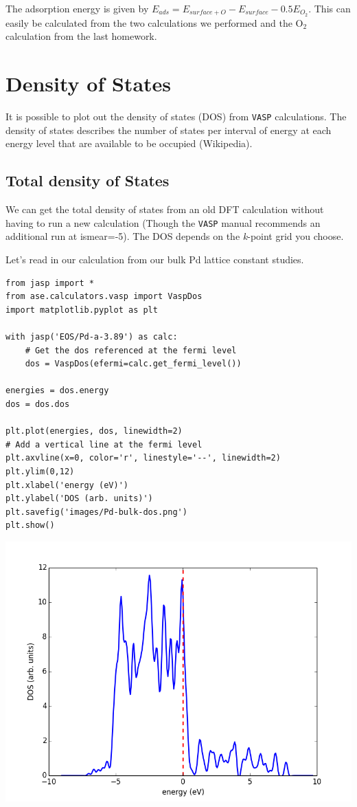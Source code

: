 \documentclass[11pt]{article}
\begin{document}
The adsorption energy is given by $E_{ads} = E_{surface+O} - E_{surface} - 0.5 E_{O_{2}}$. This can easily be calculated from the two calculations we performed and the O$_{\text{2}}$ calculation from the last homework.


\section{Density of States}
\label{sec-4}

It is possible to plot out the density of states (DOS) from \texttt{VASP} calculations. The density of states describes the number of states per interval of energy at each energy level that are available to be occupied (Wikipedia). 

\subsection{Total density of States}
\label{sec-4-1}

We can get the total density of states from an old DFT calculation without having to run a new calculation (Though the \texttt{VASP} manual recommends an additional run at ismear=-5). The DOS depends on the \emph{k}-point grid you choose.


Let's read in our calculation from our bulk Pd lattice constant studies.

\begin{verbatim}
from jasp import *
from ase.calculators.vasp import VaspDos
import matplotlib.pyplot as plt

with jasp('EOS/Pd-a-3.89') as calc:
    # Get the dos referenced at the fermi level
    dos = VaspDos(efermi=calc.get_fermi_level())
  
energies = dos.energy
dos = dos.dos

plt.plot(energies, dos, linewidth=2)
# Add a vertical line at the fermi level
plt.axvline(x=0, color='r', linestyle='--', linewidth=2)
plt.ylim(0,12)
plt.xlabel('energy (eV)')
plt.ylabel('DOS (arb. units)')
plt.savefig('images/Pd-bulk-dos.png')
plt.show()
\end{verbatim}

\includegraphics[width=.9\linewidth]{./images/Pd-bulk-dos.png}
\end{document}
